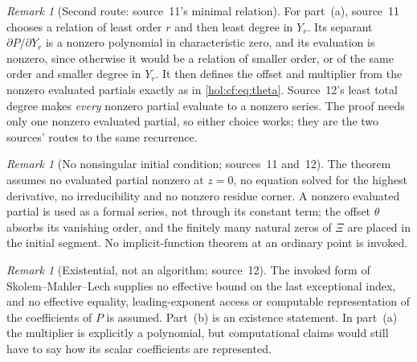 \documentclass[11pt]{article}
\numberwithin{equation}{section}
\theoremstyle{definition}
\theoremstyle{remark}
\newtheorem{remark}[theorem]{Remark}
\begin{document}
\begin{remark}[Second route: source~11's minimal relation]
\label{hol:cf:rem:separant}
For part~(a), source~11 chooses a relation of least order $r$ and then least
degree in $Y_r$. Its separant $\partial P/\partial Y_r$ is a nonzero
polynomial in characteristic zero, and its evaluation is nonzero, since
otherwise it would be a relation of smaller order, or of the same order and
smaller degree in $Y_r$. It then defines the offset and multiplier from the
nonzero evaluated partials exactly as in \eqref{hol:cf:eq:theta}. Source~12's
least total degree makes \emph{every} nonzero partial evaluate to a nonzero
series. The proof needs only one nonzero evaluated partial, so either choice
works; they are the two sources' routes to the same recurrence.
\end{remark}

\begin{remark}[No nonsingular initial condition; sources~11 and~12]
\label{hol:cf:rem:singular}
The theorem assumes no evaluated partial nonzero at $z=0$, no equation solved
for the highest derivative, no irreducibility and no nonzero residue corner. A nonzero
evaluated partial is used as a formal series, not through its constant term;
the offset $\theta$ absorbs its vanishing order, and the finitely many natural
zeros of $\Xi$ are placed in the initial segment. No implicit-function
theorem at an ordinary point is invoked.
\end{remark}

\begin{remark}[Existential, not an algorithm; source~12]
\label{hol:cf:rem:existential}
The invoked form of Skolem--Mahler--Lech supplies no effective bound on the
last exceptional index, and no
effective equality, leading-exponent access or computable representation of
the coefficients of $P$ is assumed. Part~(b) is an existence statement. In
part~(a) the multiplier is explicitly a polynomial, but computational claims
would still have to say how its scalar coefficients are represented.
\end{remark}
\end{document}

